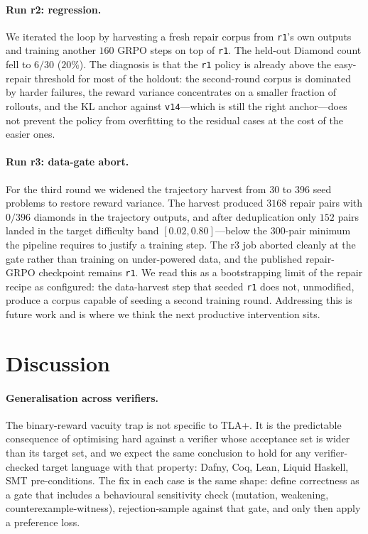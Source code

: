 \documentclass[11pt]{article}
\begin{document}
\paragraph{Run r2: regression.} We iterated the loop by harvesting a
fresh repair corpus from \texttt{r1}'s own outputs and training
another $160$ GRPO steps on top of \texttt{r1}. The held-out Diamond
count fell to $6/30$ ($20\%$). The diagnosis is that the \texttt{r1}
policy is already above the easy-repair threshold for most of the
holdout: the second-round corpus is dominated by harder failures,
the reward variance concentrates on a smaller fraction of rollouts,
and the KL anchor against \texttt{v14}---which is still the right
anchor---does not prevent the policy from overfitting to the residual
cases at the cost of the easier ones.

\paragraph{Run r3: data-gate abort.} For the third round we widened
the trajectory harvest from $30$ to $396$ seed problems to restore
reward variance. The harvest produced $3168$ repair pairs with
$0/396$ diamonds in the trajectory outputs, and after deduplication
only $152$ pairs landed in the target difficulty band
$[0.02, 0.80]$---below the $300$-pair minimum the pipeline requires
to justify a training step. The r3 job aborted cleanly at the gate
rather than training on under-powered data, and the published
repair-GRPO checkpoint remains \texttt{r1}. We read this as a
bootstrapping limit of the repair recipe as configured: the
data-harvest step that seeded \texttt{r1} does not, unmodified,
produce a corpus capable of seeding a second training round.
Addressing this is future work and is where we think the
next productive intervention sits.

\section{Discussion}
\label{sec:discussion}

\paragraph{Generalisation across verifiers.} The binary-reward vacuity
trap is not specific to TLA+. It is the predictable consequence of
optimising hard against a verifier whose acceptance set is wider than
its target set, and we expect the same conclusion to hold for any
verifier-checked target language with that property: Dafny, Coq, Lean,
Liquid Haskell, SMT pre-conditions. The fix in each case is the same
shape: define correctness as a gate that includes a behavioural
sensitivity check (mutation, weakening, counterexample-witness),
rejection-sample against that gate, and only then apply a preference
loss.
\end{document}
